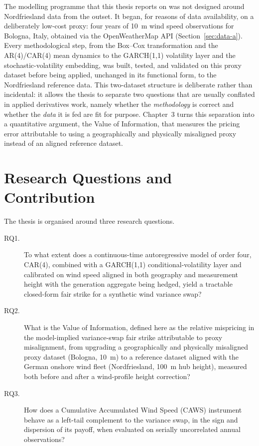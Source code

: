 ﻿\documentclass[11pt, a4paper, twoside]{article}
\begin{document}
The modelling programme that this thesis reports on was not designed around Nordfriesland data from the outset. It began, for reasons of data availability, on a deliberately low-cost proxy: four years of 10~m wind speed observations for Bologna, Italy, obtained via the OpenWeatherMap API (Section~\ref{sec:data-a}). Every methodological step, from the Box--Cox transformation and the AR(4)/CAR(4) mean dynamics to the GARCH(1,1) volatility layer and the stochastic-volatility embedding, was built, tested, and validated on this proxy dataset before being applied, unchanged in its functional form, to the Nordfriesland reference data. This two-dataset structure is deliberate rather than incidental: it allows the thesis to separate two questions that are usually conflated in applied derivatives work, namely whether the \emph{methodology} is correct and whether the \emph{data} it is fed are fit for purpose. Chapter~3 turns this separation into a quantitative argument, the Value of Information, that measures the pricing error attributable to using a geographically and physically misaligned proxy instead of an aligned reference dataset.

\section{Research Questions and Contribution}
\label{sec:rqs}

The thesis is organised around three research questions.

\begin{description}
\item[RQ1.] To what extent does a continuous-time autoregressive model of order four, CAR(4), combined with a GARCH(1,1) conditional-volatility layer and calibrated on wind speed aligned in both geography and measurement height with the generation aggregate being hedged, yield a tractable closed-form fair strike for a synthetic wind variance swap?
\item[RQ2.] What is the Value of Information, defined here as the relative mispricing in the model-implied variance-swap fair strike attributable to proxy misalignment, from upgrading a geographically and physically misaligned proxy dataset (Bologna, 10~m) to a reference dataset aligned with the German onshore wind fleet (Nordfriesland, 100~m hub height), measured both before and after a wind-profile height correction?
\item[RQ3.] How does a Cumulative Accumulated Wind Speed (CAWS) instrument behave as a left-tail complement to the variance swap, in the sign and dispersion of its payoff, when evaluated on serially uncorrelated annual observations?
\end{description}
\end{document}

